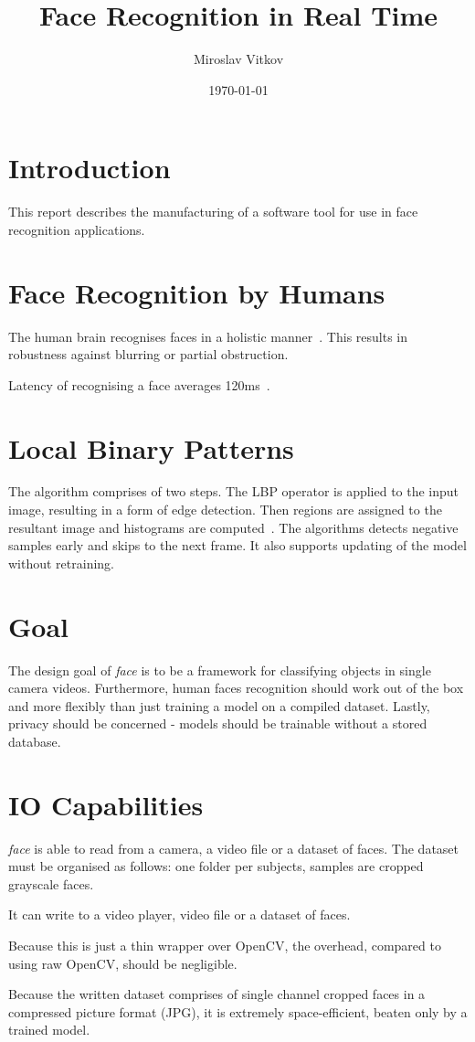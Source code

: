 \documentclass{article}
\title{Face Recognition in Real Time}
\author{Miroslav Vitkov}
\date{\today}
\newcommand{\face}[0]{\textit{face }}
\newcommand{\para}[0]{\\ \par \noindent}
\begin{document}
\maketitle


\section{Introduction}
This report describes the manufacturing of a software tool for use in face recognition applications.


\section{Face Recognition by Humans}
The human brain recognises faces in a holistic manner~\cite{sinha}.
This results in robustness against blurring or partial obstruction.
\para
Latency of recognising a face averages 120ms~\cite{sinha}.


\section{Local Binary Patterns}
The algorithm comprises of two steps.
The LBP operator is applied to the input image, resulting in a form of edge detection. 
Then regions are assigned to the resultant image and histograms are computed~\cite{ahonen}.
The algorithms detects negative samples early and skips to the next frame.
It also supports updating of the model without retraining.


\section{Goal}
The design goal of \face is to be a framework for classifying objects in single camera videos.
Furthermore, human faces recognition should work out of the box and more flexibly than just training a model on a compiled dataset.
Lastly, privacy should be concerned - models should be trainable without a stored database.

\section{IO Capabilities}
\face is able to read from a camera, a video file or a dataset of faces.
The dataset must be organised as follows: one folder per subjects, samples are cropped grayscale faces.
\para
It can write to a video player, video file or a dataset of faces.
\para
Because this is just a thin wrapper over OpenCV, the overhead, compared to using raw OpenCV, should be negligible.
\para
Because the written dataset comprises of single channel cropped faces in a compressed picture format (JPG), it is extremely space-efficient, 
beaten only by a trained model.
\end{document}
